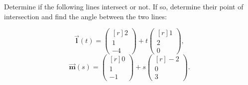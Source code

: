 \documentclass[paper=letter, 11pt]{article}
\newcommand*{\vek}{\begin{pmatrix*}[r]}
\newcommand*{\tor}{\end{pmatrix*}}
\renewcommand{\v}[1]{\vec{\mathbf{#1}}}
\begin{document}
\Prob Determine if the following lines intersect or not.  If so,
determine their point of intersection and find the angle between
the two lines:

\[ \v{l}(t) = \vek 2 \\ 1 \\ -4 \tor + t \vek 1 \\ 2 \\ 0 \tor, \]
\[ \v{m}(s) = \vek 0 \\ 1 \\ -1 \tor + s \vek -2 \\ 0 \\ 3 \tor. \]

\newpage
\end{document}
